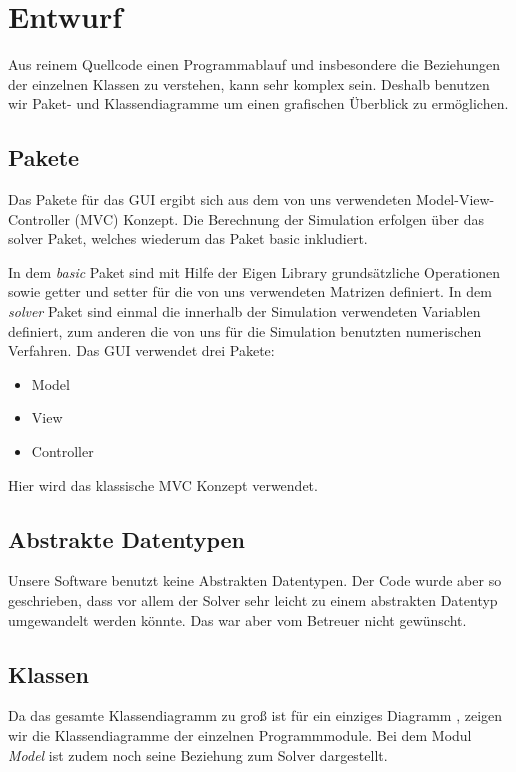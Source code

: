 \documentclass[a4paper,12pt]{scrreprt}
\begin{document}
\chapter{Entwurf}

Aus reinem Quellcode einen Programmablauf und insbesondere die Beziehungen der einzelnen Klassen zu verstehen, kann sehr komplex sein. Deshalb benutzen wir Paket- und Klassendiagramme um einen grafischen Überblick zu ermöglichen.

\section{Pakete}

Das Pakete f\"ur das GUI ergibt sich aus dem von uns verwendeten Model-View-Controller (MVC) Konzept. Die Berechnung der Simulation erfolgen \"uber das solver Paket, welches wiederum das Paket basic inkludiert. 

In dem \textit{basic} Paket sind mit Hilfe der Eigen Library grunds\"atzliche Operationen sowie getter und setter f\"ur die von uns verwendeten Matrizen definiert. In dem \textit{solver} Paket sind einmal die innerhalb der Simulation verwendeten Variablen definiert, zum anderen die von uns f\"ur die Simulation benutzten numerischen Verfahren. 
Das GUI verwendet drei Pakete:
\begin{itemize}
\item Model
\item View
\item Controller
\end{itemize}

Hier wird das klassische MVC Konzept verwendet.

\section{Abstrakte Datentypen}

Unsere Software benutzt keine Abstrakten Datentypen. Der Code wurde aber so geschrieben, dass vor allem der Solver sehr leicht zu einem abstrakten Datentyp umgewandelt werden k\"onnte.  Das war aber vom Betreuer nicht gew\"unscht.

\section{Klassen}
\label{sec:Klassenkapitel}

Da das gesamte Klassendiagramm zu groß ist f\"ur ein einziges Diagramm , zeigen wir die Klassendiagramme der einzelnen Programmmodule. Bei dem Modul \textit{Model} ist zudem noch seine Beziehung zum Solver dargestellt.
\end{document}
